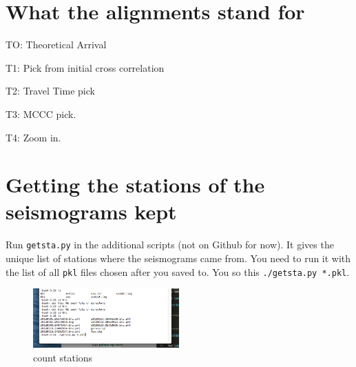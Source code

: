 \documentclass[letterpaper,10pt]{article}
\begin{document}
\section{What the alignments stand for}

TO: Theoretical Arrival

T1: Pick from initial cross correlation

T2: Travel Time pick

T3: MCCC pick.

T4: Zoom in.


\section{Getting the stations of the seismograms kept}

Run \verb"getsta.py" in the additional scripts (not on Github for now). It gives the unique list of stations where the seismograms came from. You need to run it with the list of all \verb"pkl" files chosen after you saved to. You so this \verb"./getsta.py *.pkl". 

\begin{figure}[h!]
  \centering
  \includegraphics[width=0.5\textwidth]{images/count_stations}
  \caption{count stations}
  \label{fig:count_stations}
\end{figure}
\end{document}
